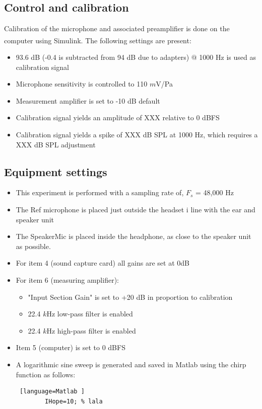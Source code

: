 \subsection{Control and calibration}
Calibration of the microphone and associated preamplifier is done on the computer using Simulink\textsuperscript{\textregistered}. The following settings are present:
\begin{itemize}
	\item 93.6 dB (-0.4 is subtracted from 94 dB due to adapters) $@$ 1000 Hz is used as calibration signal
	\item Microphone sensitivity is controlled to 110 $m$V/Pa
	\item Measurement amplifier is set to -10 dB default
	\item Calibration signal yields an amplitude of XXX relative to 0 dBFS
	\item  Calibration signal yields a spike of XXX dB SPL at 1000 Hz, which requires a XXX dB SPL adjustment
\end{itemize}
\subsection{Equipment settings}
\begin{itemize}
	\item This experiment is performed with a sampling rate of, $F_{s}$ = 48,000 Hz
	\item The Ref microphone is placed just outside the headset i line with the ear and speaker unit
	\item The SpeakerMic is placed inside the headphone, as close to the speaker unit as possible. 
	\item For item 4 (sound capture card) all gains are set at 0dB		
	\item For item 6 (measuring amplifier):
	\begin{itemize}
		\item "Input Section Gain" is set to +20 dB in proportion to calibration
		\item 22.4 $k$Hz low-pass filter is enabled
		\item 22.4 $k$Hz high-pass filter is enabled 
	\end{itemize}
	\item Item 5 (computer) is set to 0 dBFS
	\item A logarithmic sine sweep is generated and saved in Matlab using the chirp function as follows:
	\begin{lstlisting} [language=Matlab	]
		IHope=10; % lala
	\end{lstlisting}
\end{itemize}

